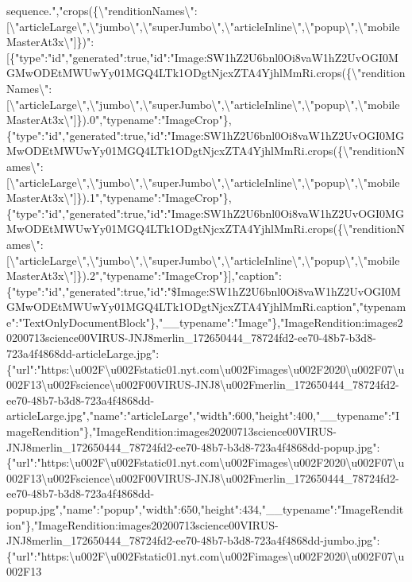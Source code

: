 sequence.","crops(\{\textbackslash{}"renditionNames\textbackslash{}":{[}\textbackslash{}"articleLarge\textbackslash{}",\textbackslash{}"jumbo\textbackslash{}",\textbackslash{}"superJumbo\textbackslash{}",\textbackslash{}"articleInline\textbackslash{}",\textbackslash{}"popup\textbackslash{}",\textbackslash{}"mobileMasterAt3x\textbackslash{}"{]}\})":{[}\{"type":"id","generated":true,"id":"Image:SW1hZ2U6bnl0Oi8vaW1hZ2UvOGI0MGMwODEtMWUwYy01MGQ4LTk1ODgtNjcxZTA4YjhlMmRi.crops(\{\textbackslash{}"renditionNames\textbackslash{}":{[}\textbackslash{}"articleLarge\textbackslash{}",\textbackslash{}"jumbo\textbackslash{}",\textbackslash{}"superJumbo\textbackslash{}",\textbackslash{}"articleInline\textbackslash{}",\textbackslash{}"popup\textbackslash{}",\textbackslash{}"mobileMasterAt3x\textbackslash{}"{]}\}).0","typename":"ImageCrop"\},\{"type":"id","generated":true,"id":"Image:SW1hZ2U6bnl0Oi8vaW1hZ2UvOGI0MGMwODEtMWUwYy01MGQ4LTk1ODgtNjcxZTA4YjhlMmRi.crops(\{\textbackslash{}"renditionNames\textbackslash{}":{[}\textbackslash{}"articleLarge\textbackslash{}",\textbackslash{}"jumbo\textbackslash{}",\textbackslash{}"superJumbo\textbackslash{}",\textbackslash{}"articleInline\textbackslash{}",\textbackslash{}"popup\textbackslash{}",\textbackslash{}"mobileMasterAt3x\textbackslash{}"{]}\}).1","typename":"ImageCrop"\},\{"type":"id","generated":true,"id":"Image:SW1hZ2U6bnl0Oi8vaW1hZ2UvOGI0MGMwODEtMWUwYy01MGQ4LTk1ODgtNjcxZTA4YjhlMmRi.crops(\{\textbackslash{}"renditionNames\textbackslash{}":{[}\textbackslash{}"articleLarge\textbackslash{}",\textbackslash{}"jumbo\textbackslash{}",\textbackslash{}"superJumbo\textbackslash{}",\textbackslash{}"articleInline\textbackslash{}",\textbackslash{}"popup\textbackslash{}",\textbackslash{}"mobileMasterAt3x\textbackslash{}"{]}\}).2","typename":"ImageCrop"\}{]},"caption":\{"type":"id","generated":true,"id":"\$Image:SW1hZ2U6bnl0Oi8vaW1hZ2UvOGI0MGMwODEtMWUwYy01MGQ4LTk1ODgtNjcxZTA4YjhlMmRi.caption","typename":"TextOnlyDocumentBlock"\},"\_\_typename":"Image"\},"ImageRendition:images20200713science00VIRUS-JNJ8merlin\_172650444\_78724fd2-ee70-48b7-b3d8-723a4f4868dd-articleLarge.jpg":\{"url":"https:\textbackslash{}u002F\textbackslash{}u002Fstatic01.nyt.com\textbackslash{}u002Fimages\textbackslash{}u002F2020\textbackslash{}u002F07\textbackslash{}u002F13\textbackslash{}u002Fscience\textbackslash{}u002F00VIRUS-JNJ8\textbackslash{}u002Fmerlin\_172650444\_78724fd2-ee70-48b7-b3d8-723a4f4868dd-articleLarge.jpg","name":"articleLarge","width":600,"height":400,"\_\_typename":"ImageRendition"\},"ImageRendition:images20200713science00VIRUS-JNJ8merlin\_172650444\_78724fd2-ee70-48b7-b3d8-723a4f4868dd-popup.jpg":\{"url":"https:\textbackslash{}u002F\textbackslash{}u002Fstatic01.nyt.com\textbackslash{}u002Fimages\textbackslash{}u002F2020\textbackslash{}u002F07\textbackslash{}u002F13\textbackslash{}u002Fscience\textbackslash{}u002F00VIRUS-JNJ8\textbackslash{}u002Fmerlin\_172650444\_78724fd2-ee70-48b7-b3d8-723a4f4868dd-popup.jpg","name":"popup","width":650,"height":434,"\_\_typename":"ImageRendition"\},"ImageRendition:images20200713science00VIRUS-JNJ8merlin\_172650444\_78724fd2-ee70-48b7-b3d8-723a4f4868dd-jumbo.jpg":\{"url":"https:\textbackslash{}u002F\textbackslash{}u002Fstatic01.nyt.com\textbackslash{}u002Fimages\textbackslash{}u002F2020\textbackslash{}u002F07\textbackslash{}u002F13\textbacks